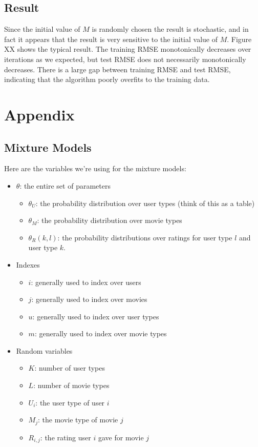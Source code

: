 \documentclass{article}
\begin{document}
\subsection{Result}

Since the initial value of $M$ is randomly chosen the result is stochastic, and in fact it appears that the result is very sensitive to the initial value of $M$. Figure XX shows the typical result. The training RMSE monotonically decreases over iterations as we expected, but test RMSE does not necessarily monotonically decreases. There is a large gap between training RMSE and test RMSE, indicating that the algorithm poorly overfits to the training data.



\section{Appendix}

\subsection{Mixture Models}

Here are the variables we're using for the mixture models:

\begin{itemize}
\item $\theta$: the entire set of parameters
  \begin{itemize}
  \item $\theta_U$: the probability distribution over user types (think
    of this as a table)
  \item $\theta_M$: the probability distribution over movie types
  \item $\theta_R(k,l)$: the probability distributions over ratings for user
    type $l$ and user type $k$.
  \end{itemize}
\item Indexes
  \begin{itemize}
  \item $i$: generally used to index over users
  \item $j$: generally used to index over movies
  \item $u$: generally used to index over user types
  \item $m$: generally used to index over movie types
  \end{itemize}
\item Random variables
  \begin{itemize}
  \item $K$: number of user types
  \item $L$: number of movie types
  \item $U_i$: the user type of user $i$
  \item $M_j$: the movie type of movie $j$
  \item $R_{i,j}$: the rating user $i$ gave for movie $j$
  \end{itemize}
\end{itemize}
\end{document}
